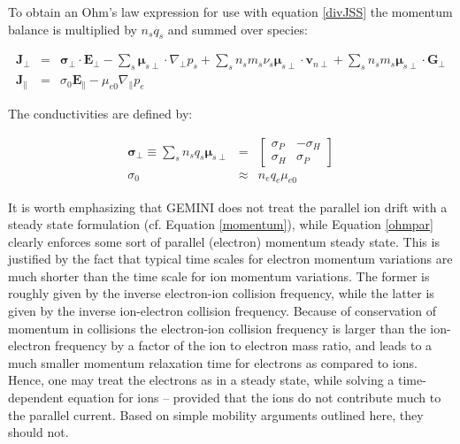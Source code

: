 \documentclass[11pt,letterpaper]{article}
\begin{document}
To obtain an Ohm's law expression for use with equation \ref{divJSS} the momentum balance is multiplied by $n_s q_s$ and summed over species:  
\begin{linenomath*} \begin{eqnarray}
\mathbf{J}_\perp &=& \boldsymbol{\sigma}_\perp \cdot \mathbf{E}_\perp - \sum_s \boldsymbol{\mu}_{s\perp} \cdot \nabla_\perp p_s + \sum_s n_s m_s \nu_s \boldsymbol{\mu}_{s\perp} \cdot \mathbf{v}_{n\perp} + \sum_s n_s m_s  \boldsymbol{\mu}_{s\perp} \cdot \mathbf{G}_\perp \label{ohm} \\
\mathbf{J}_\parallel &=& \sigma_0 \mathbf{E}_\parallel - \mu_{e0} \nabla_\parallel p_e \label{ohmpar}
\end{eqnarray} \end{linenomath*}
The conductivities are defined by:
\begin{linenomath*} \begin{eqnarray}
\boldsymbol{\sigma}_\perp
\equiv
\sum_s n_s q_s \boldsymbol{\mu}_{s\perp}
&=&
\left[ \begin{array}{ccc}
  \sigma_P & -\sigma_H \\
  \sigma_H &  \sigma_P
\end{array} \right] \\
\sigma_0 &\approx& n_e q_e \mu_{e0}
\end{eqnarray} \end{linenomath*}

It is worth emphasizing that GEMINI does not treat the parallel ion drift with a steady state formulation (cf. Equation \ref{momentum}), while Equation \ref{ohmpar} clearly enforces some sort of parallel (electron) momentum steady state.  This is justified by the fact that typical time scales for electron momentum variations are much shorter than the time scale for ion momentum variations.  The former is roughly given by the inverse electron-ion collision frequency, while the latter is given by the inverse ion-electron collision frequency. Because of conservation of momentum in collisions \citep[c.f.][]{Schunk:2009} the electron-ion collision frequency is larger than the ion-electron frequency by a factor of  the ion to electron mass ratio, and leads to a much smaller momentum relaxation time for electrons as compared to ions.  Hence, one may treat the electrons as in a steady state, while solving a time-dependent equation for ions -- provided that the ions do not contribute much to the parallel current.  Based on simple mobility arguments outlined here, they should not.
\end{document}
